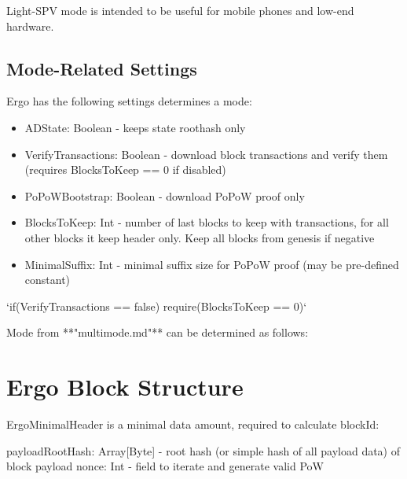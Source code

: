 \documentclass[]{report}   %
\begin{document}
Light-SPV mode is intended to be useful for mobile phones and low-end hardware. 

\subsection{Mode-Related Settings}

Ergo has the following settings determines a mode:
\begin{itemize}
  \item{ADState: Boolean} - keeps state roothash only 
  \item{VerifyTransactions: Boolean} - download block transactions and verify them (requires BlocksToKeep == 0 if disabled)
  \item{PoPoWBootstrap: Boolean} - download PoPoW proof only
  \item{BlocksToKeep: Int} - number of last blocks to keep with transactions, for all other blocks it keep header only. Keep all blocks from genesis if negative
  \item{MinimalSuffix: Int} - minimal suffix size for PoPoW proof (may be pre-defined constant)
\end{itemize}

`if(VerifyTransactions == false) require(BlocksToKeep == 0)`

Mode from **"multimode.md"** can be determined as follows:



\section{Ergo Block Structure}

ErgoMinimalHeader is a minimal data amount, required to calculate blockId:


payloadRootHash: Array[Byte] - root hash (or simple hash of all payload data) of block payload
nonce: Int - field to iterate and generate valid PoW
\end{document}

